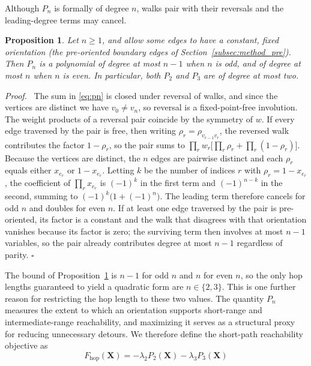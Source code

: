 \documentclass[twocolumn,a4paper]{article}
\newtheorem{proposition}[theorem]{Proposition}
\newenvironment{proof}{\par\noindent\textit{Proof.}\ }{\hfill\(\square\)\par\medskip}
\begin{document}
Although \(P_n\) is formally of degree \(n\), walks pair with their reversals and the leading-degree terms may cancel.

\begin{proposition} \label{prop:deg}
Let \(n\geq1\), and allow some edges to have a constant, fixed orientation (the pre-oriented boundary edges of Section~\ref{subsec:method_pre}). Then \(P_n\) is a polynomial of degree at most \(n-1\) when \(n\) is odd, and of degree at most \(n\) when \(n\) is even. In particular, both \(P_2\) and \(P_3\) are of degree at most two.
\end{proposition}

\begin{proof}
The sum in \eqref{eq:pn} is closed under reversal of walks, and since the vertices are distinct we have \(v_0\neq v_n\), so reversal is a fixed-point-free involution. The weight products of a reversal pair coincide by the symmetry of \(w\). If every edge traversed by the pair is free, then writing \(\rho_r=\rho_{v_{r-1}v_r}\), the reversed walk contributes the factor \(1-\rho_r\), so the pair sums to \(\prod_rw_r\bigl[\prod_r\rho_r+\prod_r(1-\rho_r)\bigr]\). Because the vertices are distinct, the \(n\) edges are pairwise distinct and each \(\rho_r\) equals either \(x_{e_r}\) or \(1-x_{e_r}\). Letting \(k\) be the number of indices \(r\) with \(\rho_r=1-x_{e_r}\), the coefficient of \(\prod_rx_{e_r}\) is \((-1)^k\) in the first term and \((-1)^{n-k}\) in the second, summing to \((-1)^k\bigl(1+(-1)^n\bigr)\). The leading term therefore cancels for odd \(n\) and doubles for even \(n\). If at least one edge traversed by the pair is pre-oriented, its factor is a constant and the walk that disagrees with that orientation vanishes because its factor is zero; the surviving term then involves at most \(n-1\) variables, so the pair already contributes degree at most \(n-1\) regardless of parity.
\end{proof}

The bound of Proposition~\ref{prop:deg} is \(n-1\) for odd \(n\) and \(n\) for even \(n\), so the only hop lengths guaranteed to yield a quadratic form are \(n\in\{2,3\}\). This is one further reason for restricting the hop length to these two values. The quantity \(P_n\) measures the extent to which an orientation supports short-range and intermediate-range reachability, and maximizing it serves as a structural proxy for reducing unnecessary detours. We therefore define the short-path reachability objective as
\begin{equation}
F_{\mathrm{hop}}(\mathbf{X})=-\lambda_2P_2(\mathbf{X})-\lambda_3P_3(\mathbf{X})
\end{equation}
\end{document}
